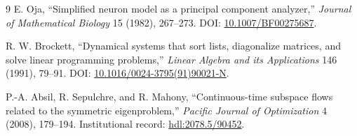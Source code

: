 \documentclass[10pt]{article}
\begin{document}
\begin{thebibliography}{9}
E. Oja, ``Simplified neuron model as a principal component analyzer,''
\emph{Journal of Mathematical Biology} 15 (1982), 267--273.
DOI: \href{https://doi.org/10.1007/BF00275687}{10.1007/BF00275687}.

R. W. Brockett, ``Dynamical systems that sort lists, diagonalize matrices, and
solve linear programming problems,'' \emph{Linear Algebra and its
Applications} 146 (1991), 79--91.
DOI: \href{https://doi.org/10.1016/0024-3795(91)90021-N}
{10.1016/0024-3795(91)90021-N}.

P.-A. Absil, R. Sepulchre, and R. Mahony, ``Continuous-time subspace flows
related to the symmetric eigenproblem,'' \emph{Pacific Journal of
Optimization} 4 (2008), 179--194. Institutional record:
\href{https://hdl.handle.net/2078.5/90452}{hdl:2078.5/90452}.
\end{thebibliography}
\end{document}
